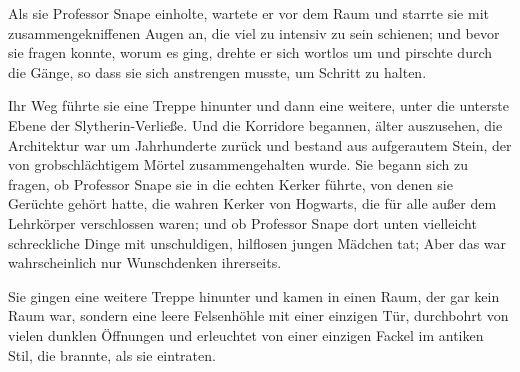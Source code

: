 Als sie Professor Snape einholte, wartete er vor dem Raum und starrte sie mit zusammengekniffenen Augen an, die viel zu intensiv zu sein schienen; und bevor sie fragen konnte, worum es ging, drehte er sich wortlos um und pirschte durch die Gänge, so dass sie sich anstrengen musste, um Schritt zu halten.

Ihr Weg führte sie eine Treppe hinunter und dann eine weitere, unter die unterste Ebene der Slytherin-Verließe. Und die Korridore begannen, älter auszusehen, die Architektur war um Jahrhunderte zurück und bestand aus aufgerautem Stein, der von grobschlächtigem Mörtel zusammengehalten wurde. Sie begann sich zu fragen, ob Professor Snape sie in die echten Kerker führte, von denen sie Gerüchte gehört hatte, die wahren Kerker von Hogwarts, die für alle außer dem Lehrkörper verschlossen waren; und ob Professor Snape dort unten vielleicht schreckliche Dinge mit unschuldigen, hilflosen jungen Mädchen tat; Aber das war wahrscheinlich nur Wunschdenken ihrerseits.

Sie gingen eine weitere Treppe hinunter und kamen in einen Raum, der gar kein Raum war, sondern eine leere Felsenhöhle mit einer einzigen Tür, durchbohrt von vielen dunklen Öffnungen und erleuchtet von einer einzigen Fackel im antiken Stil, die brannte, als sie eintraten.

